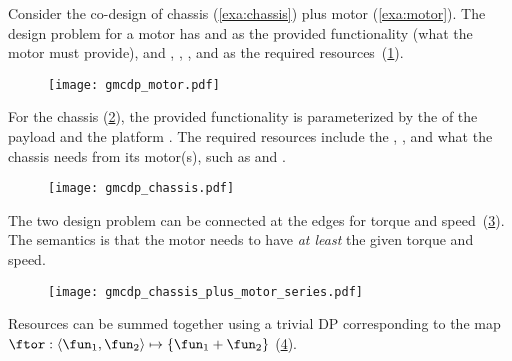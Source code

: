 \begin{example}
  \label{exa:chassis_plus_motor}Consider the co-design of chassis (\cref{exa:chassis})
  plus motor (\cref{exa:motor}). The design problem for a motor has 
  and  as the provided functionality (what the motor must
  provide), and , , , and 
  as the required resources~(\cref{fig:motor}).

  \begin{figure}[h]
    \centering
    \texttt{[image: gmcdp\_motor.pdf]}
    \label{fig:motor}
  \end{figure}


  \noindent For the chassis (\cref{fig:gmcdp_chassis}), the provided
  functionality is parameterized by the  of the payload and
  the platform . The required resources include the ,
  , and what the chassis needs from its motor(s), such
  as  and .

  \begin{figure}[h]
    \centering
    \texttt{[image: gmcdp\_chassis.pdf]}
    \caption{\label{fig:gmcdp_chassis}}
  \end{figure}


  \noindent The two design problem can be connected at the edges for
  torque and speed~(\cref{fig:gmcdp_chassis_plus_motor_series}). The
  semantics is that the motor needs to have\emph{ at least }the given
  torque and speed.

  \begin{figure}[h]
    \centering
    \texttt{[image: gmcdp\_chassis\_plus\_motor\_series.pdf]}
    \caption{\label{fig:gmcdp_chassis_plus_motor_series}}
  \end{figure}


  \noindent Resources can be summed together using a trivial DP corresponding
  to the map $\ftor:\left\langle \fun_{1},\fun_{2}\right\rangle \mapsto\{\fun_{1}+\fun_{2}\}$
  (\cref{fig:total_cost}).
  
  \begin{figure}[h]
    \centering
    \caption{\label{fig:total_cost}}
  \end{figure}
  

\end{example}
